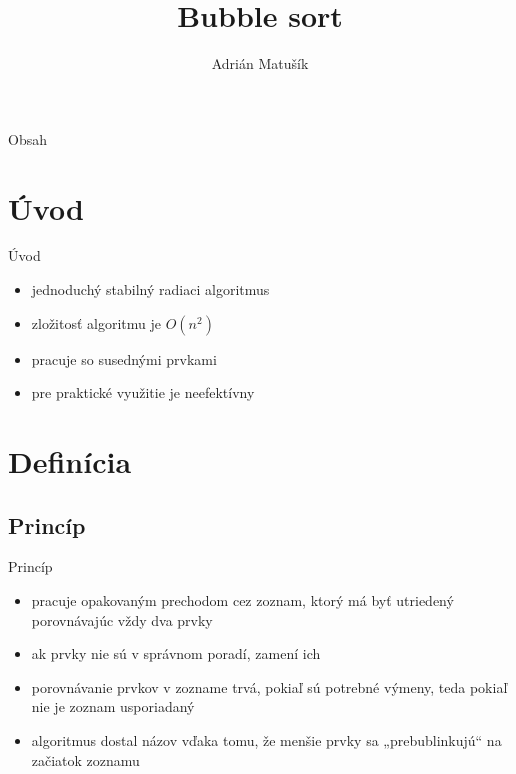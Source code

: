\documentclass[11pt]{beamer}
\title{Bubble sort}
\institute{\Large{Vysoké učení technické v~Brně}\\
Fakulta informačních technologií}
\author{Adrián Matušík}
\begin{document}
\begin{frame}
    \titlepage
\end{frame}

\begin{frame}{Obsah}
  \tableofcontents
\end{frame}

\section{Úvod}
\begin{frame}{Úvod}
    \begin{itemize}
        \setlength\itemsep{1,5em}
        \item jednoduchý stabilný radiaci algoritmus
        \item zložitosť algoritmu je $O(n^2)$
        \item pracuje so susednými prvkami
        \item pre praktické využitie je neefektívny
    \end{itemize}
\end{frame}

\section{Definícia}
\subsection{Princíp}
\begin{frame}{Princíp}
    \begin{itemize}
        \setlength\itemsep{1,5em}
        \item pracuje opakovaným prechodom cez zoznam, ktorý má byť utriedený porovnávajúc vždy dva prvky 
        \pause
        \item ak prvky nie sú v správnom poradí, zamení ich
        \pause
        \item porovnávanie prvkov v zozname trvá, pokiaľ sú potrebné výmeny, teda pokiaľ nie je zoznam usporiadaný
        \pause
        \item algoritmus dostal názov vďaka tomu, že menšie prvky sa „prebublinkujú“ na začiatok zoznamu
    \end{itemize}
\end{frame}

\end{document}
